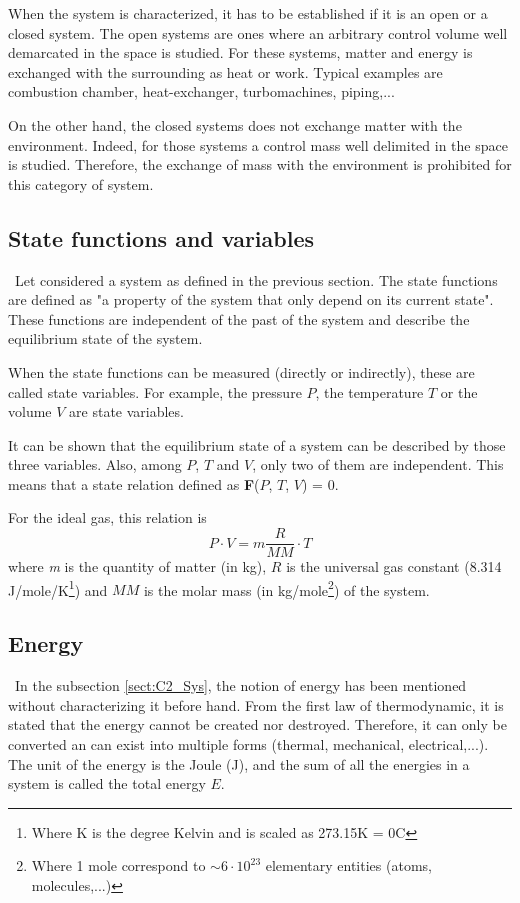When the system is characterized, it has to be established if it is an open or a closed system.
The open systems are ones where an arbitrary control volume well demarcated in the space is studied. For these systems, matter and energy is exchanged with the surrounding as heat or work. Typical examples are combustion chamber, heat-exchanger, turbomachines, piping,...

On the other hand, the closed systems does not exchange matter with the environment. Indeed, 
for those systems a control mass well delimited in the space is studied. Therefore, the exchange of mass with the environment is prohibited for this category of system. 

\subsection{State functions and variables}\label{sect:C2_State}
\quad\, Let considered a system as defined in the previous section. The state functions are defined as "a property of the system that only depend on its current state". These functions are independent of the past of the system and describe the equilibrium state of the system.

When the state functions can be measured (directly or indirectly), these are called state variables. For example, the pressure $P$, the temperature $T$ or the volume $V$ are state variables.

It can be shown that the equilibrium state of a system can be described by those three variables. Also, among $P$, $T$ and $V$, only two of them are independent. This means that a state relation defined as \textbf{F}($P$, $T$, $V$) = 0.

For the ideal gas, this relation is
\begin{equation}
P\cdot V = m\frac{R}{MM}\cdot T\label{eq:C2_GP}    
\end{equation}
where \textit{m} is the quantity of matter (in kg), $R$ is the universal gas constant (8.314 J/mole/K\footnote{Where K is the degree Kelvin and is scaled as 273.15\degree K = 0\degree C}) and $MM$ is the molar mass (in kg/mole\footnote{Where 1 mole correspond to $\sim 6\cdot 10^{23}$ elementary entities (atoms, molecules,...)}) of the system.
\newpage
\subsection{Energy}\label{sect:C2_Ener}
\quad\, In the subsection \ref{sect:C2_Sys}, the notion of energy has been mentioned without characterizing it before hand. From the first law of thermodynamic, it is stated that the energy cannot be created nor destroyed. Therefore, it can only be converted an can exist into multiple forms (thermal, mechanical, electrical,...)\cite{thermoApp_2}. The unit of the energy is the Joule (J), and the sum of all the energies in a system is called the total energy $E$.

